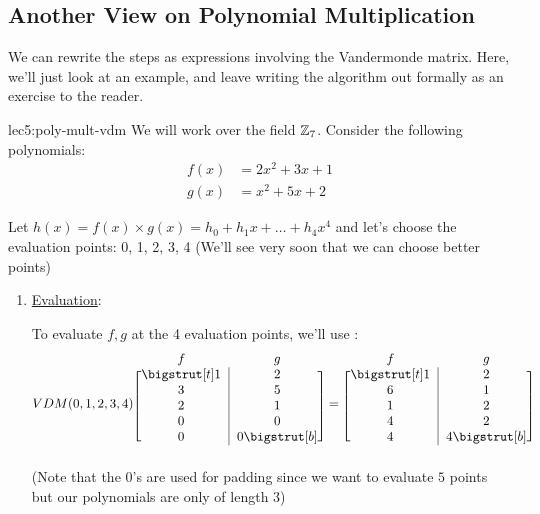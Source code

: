 \subsection{Another View on Polynomial Multiplication}
We can rewrite the steps  as expressions involving the Vandermonde matrix.
Here, we'll just look at an example, and leave writing the algorithm out formally as an exercise to the reader.

\begin{example}{}{lec5:poly-mult-vdm}
    We will work over the field $\operatorname{\mathbb{Z}}_7$.
    Consider the following polynomials:
    \begin{align*}
        f(x) &= 2x^2 + 3x + 1 \\
        g(x) &= x^2 + 5x + 2
    \end{align*}

    Let $h(x) = f(x) \times g(x) = h_0 + h_1x + \ldots + h_4x^4$ and let's choose the evaluation points: 0, 1, 2, 3, 4 (We'll see very soon that we can choose better points)
    \begin{enumerate}
        \item \ul{Evaluation}:

        To evaluate $f, g$ at the 4 evaluation points, we'll use :
        \begin{equation*}
            VDM(0,1,2,3,4)
            \begin{blockarray}{cc}
                f & g \\
                \begin{block}{[c|c]}
                    \bigstrut[t] 1 & 2 \\
                    3 & 5 \\
                    2 & 1 \\
                    0 & 0 \\
                    0 & 0 \bigstrut[b] \\
                \end{block}
            \end{blockarray}
            =
            \begin{blockarray}{cc}
                f & g \\
                \begin{block}{[c|c]}
                    \bigstrut[t] 1 & 2 \\
                    6 & 1 \\
                    1 & 2 \\
                    4 & 2 \\
                    4 & 4 \bigstrut[b] \\
                \end{block}
            \end{blockarray}
        \end{equation*} 
        (Note that the $0$'s are used for padding since we want to evaluate $5$ points but our polynomials are only of length $3$)


\end{enumerate}
\end{example}

